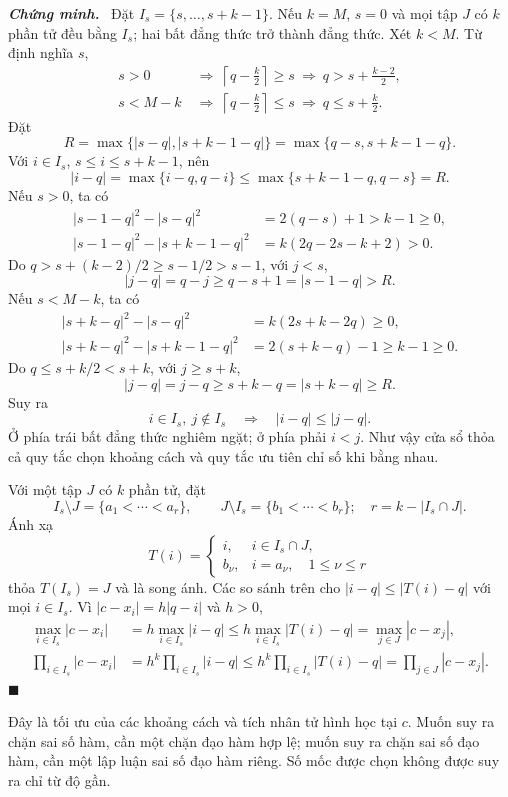 \documentclass[12pt,a4paper,oneside]{book}
\numberwithin{algorithm}{chapter}
\theoremstyle{definition}
\newenvironment{chungminh}{\par\medskip\noindent\textbf{\textit{\color{mainblue}Chứng minh.}}\ }{\hfill$\blacksquare$\par\medskip}
\begin{document}
\begin{chungminh}
Đặt $I_s=\{s,\ldots,s+k-1\}$. Nếu $k=M$, $s=0$ và mọi tập $J$ có $k$ phần tử đều bằng $I_s$; hai bất đẳng thức trở thành đẳng thức. Xét $k<M$. Từ định nghĩa $s$,
\begin{align*}
 s>0&\ \Longrightarrow\ \left\lceil q-\frac k2\right\rceil\geq s
 \ \Longrightarrow\ q>s+\frac{k-2}{2},\\
 s<M-k&\ \Longrightarrow\ \left\lceil q-\frac k2\right\rceil\leq s
 \ \Longrightarrow\ q\leq s+\frac k2.
\end{align*}
Đặt
\[
 R=\max\{|s-q|,|s+k-1-q|\}
 =\max\{q-s,s+k-1-q\}.
\]
Với $i\in I_s$, $s\leq i\leq s+k-1$, nên
\[
 |i-q|=\max\{i-q,q-i\}
 \leq\max\{s+k-1-q,q-s\}=R.
\]
Nếu $s>0$, ta có
\begin{align*}
 |s-1-q|^2-|s-q|^2&=2(q-s)+1>k-1\geq0,\\
 |s-1-q|^2-|s+k-1-q|^2&=k(2q-2s-k+2)>0.
\end{align*}
Do $q>s+(k-2)/2\geq s-1/2>s-1$, với $j<s$,
\[
 |j-q|=q-j\geq q-s+1=|s-1-q|>R.
\]
Nếu $s<M-k$, ta có
\begin{align*}
 |s+k-q|^2-|s-q|^2&=k(2s+k-2q)\geq0,\\
 |s+k-q|^2-|s+k-1-q|^2&=2(s+k-q)-1\geq k-1\geq0.
\end{align*}
Do $q\leq s+k/2<s+k$, với $j\geq s+k$,
\[
 |j-q|=j-q\geq s+k-q=|s+k-q|\geq R.
\]
Suy ra
\[
 i\in I_s,\ j\notin I_s\quad\Longrightarrow\quad |i-q|\leq|j-q|.
\]
Ở phía trái bất đẳng thức nghiêm ngặt; ở phía phải $i<j$. Như vậy cửa sổ thỏa cả quy tắc chọn khoảng cách và quy tắc ưu tiên chỉ số khi bằng nhau.

Với một tập $J$ có $k$ phần tử, đặt
\[
 I_s\setminus J=\{a_1<\cdots<a_r\},\qquad
 J\setminus I_s=\{b_1<\cdots<b_r\};
 \quad r=k-|I_s\cap J|.
\]
Ánh xạ
\[
 T(i)=\begin{cases}i,&i\in I_s\cap J,\\b_\nu,&i=a_\nu,\quad1\leq\nu\leq r\end{cases}
\]
thỏa $T(I_s)=J$ và là song ánh. Các so sánh trên cho $|i-q|\leq|T(i)-q|$ với mọi $i\in I_s$. Vì $|c-x_i|=h|q-i|$ và $h>0$,
\begin{align*}
 \max_{i\in I_s}|c-x_i|
 &=h\max_{i\in I_s}|i-q|
 \leq h\max_{i\in I_s}|T(i)-q|
 =\max_{j\in J}|c-x_j|,\\
 \prod_{i\in I_s}|c-x_i|
 &=h^k\prod_{i\in I_s}|i-q|
 \leq h^k\prod_{i\in I_s}|T(i)-q|
 =\prod_{j\in J}|c-x_j|.
\end{align*}
\end{chungminh}
Đây là tối ưu của các khoảng cách và tích nhân tử hình học tại $c$. Muốn suy ra chặn sai số hàm, cần một chặn đạo hàm hợp lệ; muốn suy ra chặn sai số đạo hàm, cần một lập luận sai số đạo hàm riêng. Số mốc được chọn không được suy ra chỉ từ độ gần.
\end{document}
